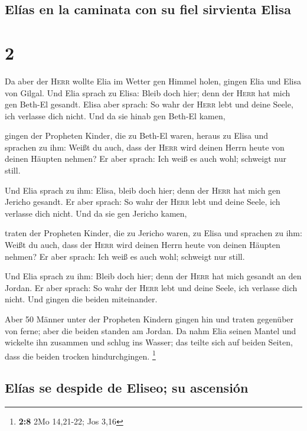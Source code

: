 \hypertarget{eluxedas-en-la-caminata-con-su-fiel-sirvienta-elisa}{%
\subsection{Elías en la caminata con su fiel sirvienta
Elisa}\label{eluxedas-en-la-caminata-con-su-fiel-sirvienta-elisa}}

\hypertarget{section-1}{%
\section{2}\label{section-1}}

 Da aber der \textsc{Herr} wollte Elia im Wetter gen
Himmel holen, gingen Elia und Elisa von Gilgal.  Und Elia
sprach zu Elisa: Bleib doch hier; denn der \textsc{Herr} hat mich gen
Beth-El gesandt. Elisa aber sprach: So wahr der \textsc{Herr} lebt und
deine Seele, ich verlasse dich nicht. Und da sie hinab gen Beth-El
kamen,

 gingen der Propheten Kinder, die zu Beth-El waren, heraus
zu Elisa und sprachen zu ihm: Weißt du auch, dass der \textsc{Herr} wird
deinen Herrn heute von deinen Häupten nehmen? Er aber sprach: Ich weiß
es auch wohl; schweigt nur still.

 Und Elia sprach zu ihm: Elisa, bleib doch hier; denn der
\textsc{Herr} hat mich gen Jericho gesandt. Er aber sprach: So wahr der
\textsc{Herr} lebt und deine Seele, ich verlasse dich nicht. Und da sie
gen Jericho kamen,

 traten der Propheten Kinder, die zu Jericho waren, zu
Elisa und sprachen zu ihm: Weißt du auch, dass der \textsc{Herr} wird
deinen Herrn heute von deinen Häupten nehmen? Er aber sprach: Ich weiß
es auch wohl; schweigt nur still.

 Und Elia sprach zu ihm: Bleib doch hier; denn der
\textsc{Herr} hat mich gesandt an den Jordan. Er aber sprach: So wahr
der \textsc{Herr} lebt und deine Seele, ich verlasse dich nicht. Und
gingen die beiden miteinander.

 Aber 50 Männer unter der Propheten Kindern gingen hin und
traten gegenüber von ferne; aber die beiden standen am Jordan.
 Da nahm Elia seinen Mantel und wickelte ihn zusammen und
schlug ins Wasser; das teilte sich auf beiden Seiten, dass die beiden
trocken hindurchgingen. \footnote{\textbf{2:8} 2Mo 14,21-22; Jos 3,16}

\hypertarget{eluxedas-se-despide-de-eliseo-su-ascensiuxf3n}{%
\subsection{Elías se despide de Eliseo; su
ascensión}\label{eluxedas-se-despide-de-eliseo-su-ascensiuxf3n}}

